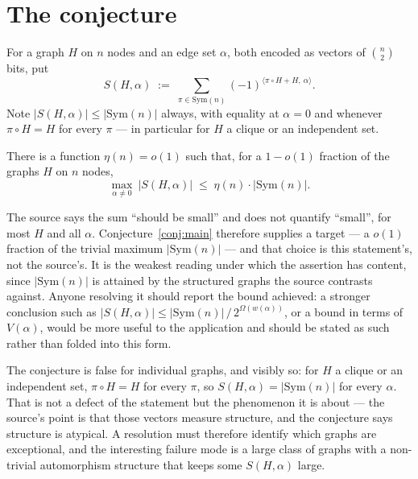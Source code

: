 \documentclass{aicr-conjecture}
\newcommand{\Sym}{\mathrm{Sym}}
\newcommand{\wt}{w}
\newcommand{\V}{V}
\begin{document}
\section{The conjecture}\label{sec:conjectures}

\begin{definition}\label{def:sum}
For a graph $H$ on $n$ nodes and an edge set $\alpha$, both encoded as
vectors of $\binom{n}{2}$ bits, put
\[
  S(H, \alpha) \;:=\; \sum_{\pi \in \Sym(n)}
  (-1)^{\langle \pi \circ H + H,\ \alpha \rangle}.
\]
Note $|S(H,\alpha)| \le |\Sym(n)|$ always, with equality at $\alpha = 0$ and
whenever $\pi \circ H = H$ for every $\pi$ --- in particular for $H$ a
clique or an independent set.
\end{definition}

\begin{conjecture}\label{conj:main}
There is a function $\eta(n) = o(1)$ such that, for a $1 - o(1)$ fraction
of the graphs $H$ on $n$ nodes,
\[
  \max_{\alpha \ne 0}\ \bigl| S(H, \alpha) \bigr| \;\le\; \eta(n) \cdot
  |\Sym(n)|.
\]
\end{conjecture}

\begin{remark}\label{rem:no-target}
The source says the sum ``should be small'' and does not quantify
``small'', for most $H$ and all $\alpha$. Conjecture~\ref{conj:main}
therefore supplies a target --- a $o(1)$ fraction of the trivial maximum
$|\Sym(n)|$ --- and that choice is this statement's, not the source's. It is the
weakest reading under which the assertion has content, since $|\Sym(n)|$ is
attained by the structured graphs the source contrasts against. Anyone
resolving it should report the bound achieved: a stronger conclusion such
as $|S(H,\alpha)| \le |\Sym(n)|\,/\,2^{\Omega(\wt(\alpha))}$, or a bound in terms
of $\V(\alpha)$, would be more useful to the application and should be
stated as such rather than folded into this form.
\end{remark}

\begin{remark}
The conjecture is false for individual graphs, and visibly so: for $H$ a
clique or an independent set, $\pi \circ H = H$ for every $\pi$, so
$S(H,\alpha) = |\Sym(n)|$ for every $\alpha$. That is not a defect of the
statement but the phenomenon it is about --- the source's point is that
those vectors measure structure, and the conjecture says structure is
atypical. A resolution must therefore identify which graphs are
exceptional, and the interesting failure mode is a large class of
graphs with a non-trivial automorphism structure that keeps some
$S(H,\alpha)$ large.
\end{remark}
\end{document}
